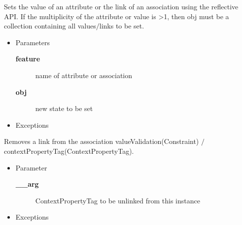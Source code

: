 \begin{desc}Sets the value of an attribute or the link of an association using the
 reflective API. If the multiplicity of the attribute or value is \textgreater  1,
 then obj must be a collection containing all values$/$links to be set.
\begin{itemize}
\item{Parameters
  \begin{description}
   \item[{\bf feature}]{name of attribute or association}
   \item[{\bf obj}]{new state to be set}
  \end{description}}
\end{itemize}
\begin{itemize}
\item{{Exceptions}
}
\end{itemize}
\end{desc}

\begin{desc}Removes a link from the association valueValidation(Constraint)
             $/$ contextPropertyTag(ContextPropertyTag).
\begin{itemize}
\item{Parameter
  \begin{description}
   \item[{\bf \_\_arg}]{ContextPropertyTag to be unlinked from this instance}
  \end{description}}
\end{itemize}
\begin{itemize}
\item{{Exceptions}
}
\end{itemize}
\end{desc}

